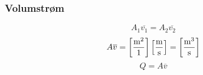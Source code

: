 \documentclass[aspectratio=169,xcolor=dvipsnames]{beamer}
\begin{document}
%
%
%
\begin{frame}
	\frametitle{Volumstrøm}

	


%
$$A_1 \overline{v_1} = A_2 \overline{v_2}$$
%
%
$$A \overline{v} = \left[\hbox{m}^2 \over 1 \right] \left[\hbox{m} \over \hbox{s} \right] = \left[\hbox{m}^3 \over \hbox{s} \right]$$
%
%
$$Q = A \overline{v}$$
%
\end{frame}
%
\end{document}
